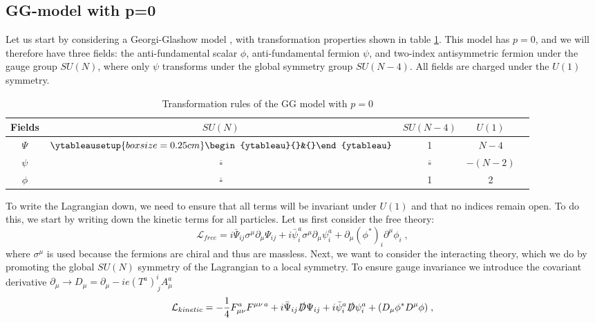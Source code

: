 \subsection{GG-model with p=0}
Let us start by considering a Georgi-Glashow model \cite{GGmodel}, with transformation properties shown in table \ref{tab:GGp0}. This model has $p=0$, and we will therefore have three fields: the anti-fundamental scalar $\phi$, anti-fundamental fermion $\psi$, and two-index antisymmetric fermion under the gauge group $SU(N)$, where only $\psi$ transforms under the global symmetry group $SU(N-4)$. All fields are charged under the $U(1)$ symmetry.  
\begin{table}[h] 
    \centering 
    \begin{tabular}{|c|c|c|c|c|} \hline Fields & $SU(N)$ & $SU(N-4)$  & $U(1)$ \\ \hline $\Psi$ & $\ytableausetup{boxsize=0.25cm}\begin{ytableau}{}&{}\end{ytableau}$ & 1 & $N-4$ \\ $\psi$ & $\overline\square$ & $\overline\square$ & $-(N-2)$ \\ \hline $\phi$ & $\overline\square$ & 1  & 2 \\ \hline 
    \end{tabular} 
    \caption{Transformation rules of the GG model with $p=0$} 
    \label{tab:GGp0} 
\end{table}
To write the Lagrangian down, we need to ensure that all terms will be invariant under $U(1)$ and that no indices remain open. To do this, we start by writing down the kinetic terms for all particles. Let us first consider the free theory:
\begin{equation}
    \mathcal{L}_{free}= i \bar \Psi_{ij}\sigma^\mu \partial_\mu\Psi_{ij}+i \bar \psi_i^a\sigma^\mu \partial_\mu\psi_i^a+\partial_\mu (\phi^*)_i\partial^\mu\phi_i\;,
\end{equation}
where $\sigma^\mu$ is used because the fermions are chiral and thus are massless. Next, we want to consider the interacting theory, which we do by promoting the global $SU(N)$ symmetry of the Lagrangian to a local symmetry. To ensure gauge invariance we introduce the covariant derivative $\partial_\mu \to D_\mu= \partial_\mu - ie(T^a)^i_{\,j}A_\mu^a$
\begin{equation}
    \mathcal{L}_{kinetic}= -\frac{1}{4} F_{\mu\nu}^a F^{\mu\nu\,a}+i \bar \Psi_{ij}\slashed{D}\Psi_{ij}+i \bar \psi_i^a\slashed{D}\psi_i^a+(D_\mu \phi^*D^\mu\phi)\;,
\end{equation}
